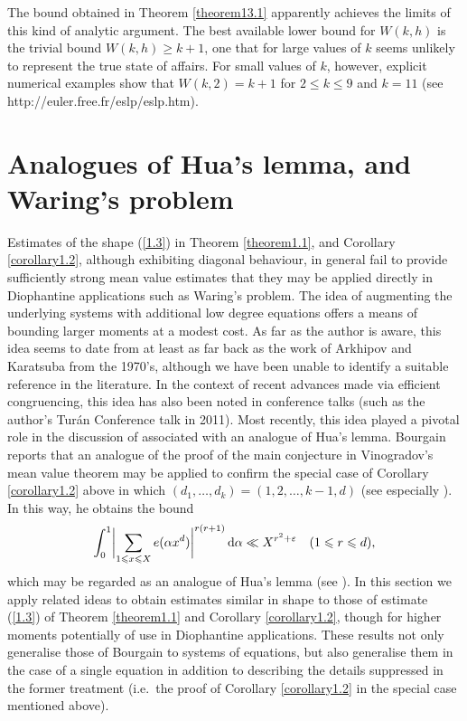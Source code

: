 \documentclass[12pt,reqno]{amsart}
\theoremstyle{definition}
\theoremstyle{remark}
\numberwithin{equation}{section}
\def\alp{{\alpha}} \def\bfalp{{\boldsymbol \alpha}}
\def\eps{\varepsilon}
\def\le{\leqslant} \def\ge{\geqslant} \def\pleq{\preccurlyeq} \def\ple{\prec}
\def\d{{\,{\rm d}}}
\begin{document}
The bound obtained in Theorem \ref{theorem13.1} apparently achieves the limits of this 
kind of analytic argument. The best available lower bound for $W(k,h)$ is the trivial bound 
$W(k,h)\ge k+1$, one that for large values of $k$ seems unlikely to represent the true state 
of affairs. For small values of $k$, however, explicit numerical examples show that 
$W(k,2)=k+1$ for $2\le k\le 9$ and $k=11$ (see 
http://euler.free.fr/eslp/eslp.htm).

\section{Analogues of Hua's lemma, and Waring's problem} Estimates of the shape 
(\ref{1.3}) in Theorem \ref{theorem1.1}, and Corollary \ref{corollary1.2}, although 
exhibiting diagonal behaviour, in general fail to provide sufficiently strong mean value 
estimates that they may be applied directly in Diophantine applications such as Waring's 
problem. The idea of augmenting the underlying systems with additional low degree 
equations offers a means of bounding larger moments at a modest cost. As far as the 
author is aware, this idea seems to date from at least as far back as the work of Arkhipov 
and Karatsuba from the 1970's, although we have been unable to identify a suitable 
reference in the literature. In the context of recent advances made via efficient 
congruencing, this idea has also been noted in conference talks (such as the author's Tur\'an 
Conference talk in 2011). Most recently, this idea played a pivotal role in the discussion of 
\cite[Theorem 10]{Bou2017} associated with an analogue of Hua's lemma. Bourgain reports 
that an analogue of the proof of the main conjecture in Vinogradov's mean value theorem 
may be applied to confirm the special case of Corollary \ref{corollary1.2} above in which 
$(d_1,\ldots ,d_k)=(1,2,\ldots ,k-1,d)$ (see especially \cite[equation (6.5)]{Bou2017}). In 
this way, he obtains the bound
\begin{equation}\label{14.1}
\int_0^1\biggl| \sum_{1\le x\le X}e(\alp x^d)\biggr|^{r(r+1)}\d\alp \ll X^{r^2+\eps}
\quad (1\le r\le d),
\end{equation}
which may be regarded as an analogue of Hua's lemma (see \cite{Hua1938b}). In this 
section we apply related ideas to obtain estimates similar in shape to those of estimate 
(\ref{1.3}) of Theorem \ref{theorem1.1} and Corollary \ref{corollary1.2}, though for 
higher moments potentially of use in Diophantine applications. These results not only 
generalise those of Bourgain \cite[Theorem 10]{Bou2017} to systems of equations, but 
also generalise them in the case of a single equation in addition to describing the details 
suppressed in the former treatment (i.e.~the proof of Corollary \ref{corollary1.2} in the 
special case mentioned above).\par
\end{document}
